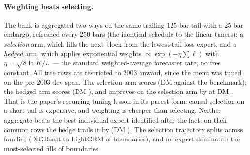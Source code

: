 \paragraph{Weighting beats selecting.} The bank is aggregated two ways
on the same trailing-$125$-bar tail with a $25$-bar embargo, refreshed
every $250$ bars (the identical schedule to the linear tuners): a
\emph{selection} arm, which fills the next block from the
lowest-tail-loss expert, and a \emph{hedged} arm, which applies
exponential weights $\propto \exp(-\eta \sum \ell)$ with
$\eta = \sqrt{8 \ln K / L}$ --- the standard weighted-average
forecaster rate, no free constant. All tree rows are restricted to
2003 onward, since the menu was tuned on the pre-2003 dev span. The
selection arm scores \unifTreeTunedQLIKE{} (DM \unifTreeTunedDM{}
against the benchmark); the
hedged arm scores \unifTreeHedgeQLIKE{} (DM \unifTreeHedgeDM{}), and
improves on the selection arm by \unifIncrTreeHedgeDQ{} at DM
\unifIncrTreeHedgeDM{}. That is the paper's recurring tuning lesson in
its purest form: causal selection on a short tail is expensive, and
weighting is cheaper than selecting. Neither aggregate beats the best
individual expert identified after the fact: on their common rows the
hedge trails it by \unifTreeBankHedgeVsBestDQ{} (DM
\unifTreeBankHedgeVsBestDM{}). The selection trajectory splits across
families (\unifTreeBankSelXgbN{} XGBoost to \unifTreeBankSelLgbmN{}
LightGBM of \unifTreeBankSelN{} boundaries), and no expert dominates:
the most-selected fills \unifTreeBankSelTopPct{} of boundaries.

